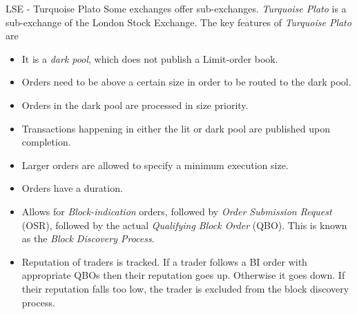 \documentclass[11pt,a4paper]{article}
\begin{document}
\begin{definition}{LSE - Turquoise Plato}
  Some exchanges offer sub-exchanges. \textit{Turquoise Plato} is a sub-exchange of the London Stock Exchange. The key features of \textit{Turquoise Plato} are
  \begin{itemize}
    \item It is a \textit{dark pool}, which does not publish a Limit-order book.
    \item Orders need to be above a certain size in order to be routed to the dark pool.
    \item Orders in the dark pool are processed in size priority.
    \item Transactions happening in either the lit or dark pool are published upon completion.
    \item Larger orders are allowed to specify a minimum execution size.
    \item Orders have a duration.
    \item Allows for \textit{Block-indication} orders, followed by \textit{Order Submission Request} (OSR), followed by the actual \textit{Qualifying Block Order} (QBO). This is known as the \textit{Block Discovery Process}.
    \item Reputation of traders is tracked. If a trader follows a BI order with appropriate QBOs then their reputation goes up. Otherwise it goes down. If their reputation falls too low, the trader is excluded from the block discovery process.
  \end{itemize}
\end{definition}
\end{document}
